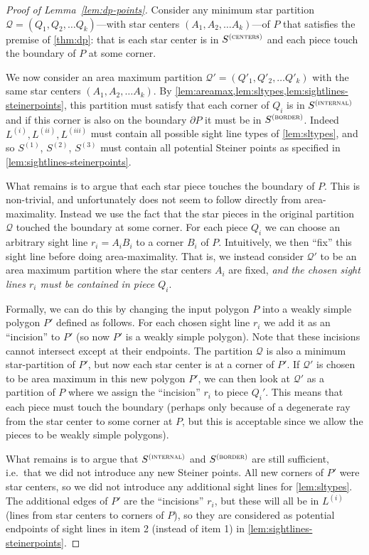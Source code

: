 \documentclass{theoretics}
\newcommand\Scen{S^{\textsc{(centers)}}}
\newcommand\Sint{S^{\textsc{(internal)}}}
\newcommand\Sbor{S^{\textsc{(border)}}}
\begin{document}
\begin{proof}[Proof of Lemma~\ref{lem:dp-points}]
Consider any minimum star partition $\mathcal{Q} = (Q_1, Q_2, \ldots Q_k)$---with star centers $(A_1, A_2, \ldots A_k)$---of $P$ that satisfies the premise of \cref{thm:dp}: that is each star center is in $\Scen$ and each piece touch the boundary of $P$ at some corner.

We now consider an area maximum partition 
 $\mathcal{Q}' = (Q'_1, Q'_2, \ldots Q'_k)$ with the same star centers $(A_1, A_2, \ldots A_k)$.
By \cref{lem:areamax,lem:sltypes,lem:sightlines-steinerpoints}, this partition must satisfy that each corner of $Q_i$ is in $\Sint$ and if this corner is also on the boundary $\partial P$ it must be in $\Sbor$. Indeed $L^{(i)}, L^{(ii)}, L^{(iii)}$ must contain all possible sight line types of \cref{lem:sltypes}, and so $S^{(1)}$, $S^{(2)}$, $S^{(3)}$ must contain all potential Steiner points as specified in \cref{lem:sightlines-steinerpoints}.

What remains is to argue that each star piece touches the boundary of $P$. This is non-trivial, and unfortunately does not seem to follow directly from area-maximality. Instead we use the fact that the star pieces in the original partition $\mathcal{Q}$ touched the boundary at some corner. For each piece $Q_i$ we can choose an arbitrary sight line $r_i = A_iB_i$ to a corner $B_i$ of $P$. Intuitively, we then ``fix'' this sight line before doing area-maximality. That is, we instead consider $\mathcal{Q}'$ to be an area maximum partition where the star centers $A_i$ are fixed, \emph{and the chosen sight lines $r_i$ must be contained in piece $Q_i$}.

Formally, we can do this by changing the input polygon $P$ into a weakly simple polygon $P'$ defined as follows. For each chosen sight line $r_i$ we add it as an ``incision'' to $P'$ (so now $P'$ is a weakly simple polygon).
Note that these incisions cannot intersect except at their endpoints. The partition $\mathcal{Q}$ is also a minimum star-partition of $P'$, but now each star center is at a corner of $P'$. If $\mathcal{Q}'$ is chosen to be area maximum in this new polygon $P'$, we can then look at $\mathcal{Q}'$ as a partition of $P$ where we assign the ``incision'' $r_i$ to piece $Q_i'$. This means that each piece must touch the boundary (perhaps only because of a degenerate ray from the star center to some corner at $P$, but this is acceptable since we allow the pieces to be weakly simple polygons).

What remains is to argue that $\Sint$ and $\Sbor$ are still sufficient, i.e.\ that we did not introduce any new Steiner points. All new corners of $P'$ were star centers, so we did not introduce any additional sight lines for \cref{lem:sltypes}. The additional edges of $P'$ are the ``incisions'' $r_i$, but these will all be in $L^{(i)}$ (lines from star centers to corners of $P$), so they are considered as potential endpoints of sight lines in item 2 (instead of item 1) in \cref{lem:sightlines-steinerpoints}.
\end{proof}
\end{document}
